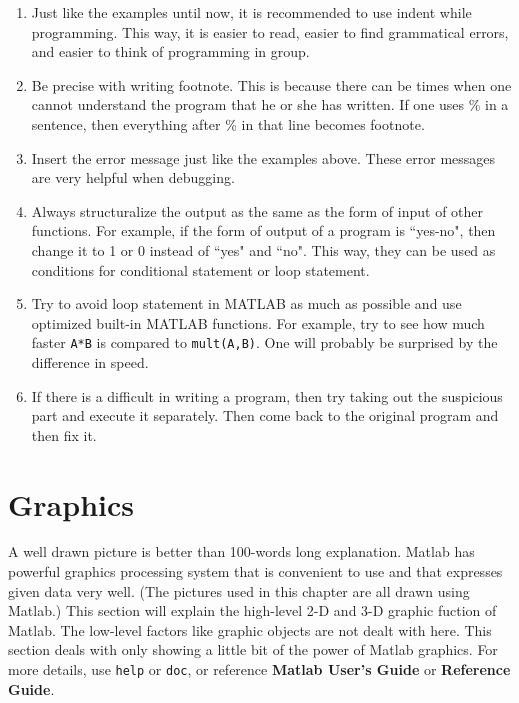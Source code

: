 \begin{enumerate}
\item Just like the examples until now, it is recommended to use indent while programming. This way, it is easier to read, easier to find  grammatical errors, and easier to think of programming in group.

\item Be precise with writing footnote. This is because there can be times when one cannot understand the program that he or she has written. If one uses \% in a sentence, then everything after \% in that line becomes footnote.

\item Insert the error message just like the examples above. These error messages are very helpful when debugging.

\item Always structuralize the output as the same as the form of input of other functions. For example, if the form of output of a program is ``yes-no", then change it to 1 or 0 instead of ``yes" and ``no". This way, they can be used as conditions for conditional statement or loop statement.

\item Try to avoid loop statement in MATLAB as much as possible and use optimized built-in MATLAB functions. For example, try to see how much faster {\tt A*B} is compared to {\tt mult(A,B)}. One will probably be surprised by the difference in speed.

\item If there is a difficult in writing a program, then try taking out the suspicious part and execute it separately. Then come back to the original program and then fix it.
\end{enumerate}
\newpage
\section{Graphics}
A well drawn picture is better than 100-words long explanation. Matlab has powerful graphics processing system that is convenient to use and that expresses given data very well. (The pictures used in this chapter are all drawn using Matlab.)  This section will explain the high-level 2-D and 3-D graphic fuction of Matlab. The low-level factors like graphic objects are not dealt with here. This section deals with only showing a little bit of the power of Matlab graphics. For more details, use {\tt help} or {\tt doc}, or reference \textbf{Matlab User's Guide} or \textbf{Reference Guide}.

